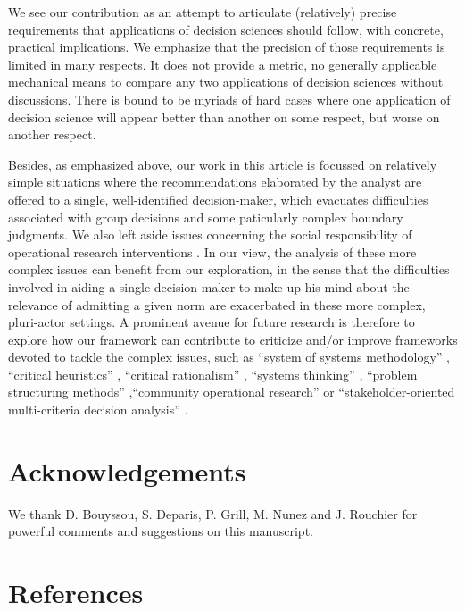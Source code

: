 \documentclass[preprint, french, english, 11pt, authoryear]{elsarticle}%
\begin{document}
We see our contribution as an attempt to articulate (relatively) precise requirements that applications of decision sciences should follow, with concrete, practical implications. We emphasize that the precision of those requirements is limited in many respects.
It does not provide a metric, no generally applicable mechanical means to compare any two applications of decision sciences without discussions. There is bound to be myriads of hard cases where one application of decision science will appear better than another on some respect, but worse on another respect.

Besides, as emphasized above, our work in this article is focussed on relatively simple situations where the recommendations elaborated by the analyst are offered to a single, well-identified decision-maker, which evacuates difficulties associated with group decisions and some paticularly complex boundary judgments. We also left aside issues concerning the social responsibility of operational research interventions \citep{ackoff_social_1974,gallo_operations_2004}.  In our view, the analysis of these more complex issues can benefit from our exploration, in the sense that the difficulties involved in aiding a single decision-maker to make up his mind about the relevance of admitting a given norm are exacerbated in these more complex, pluri-actor settings. A prominent avenue for future research is therefore to explore how our framework can contribute to criticize and/or improve frameworks devoted to tackle the complex issues, such as ``system of systems methodology'' \citep{jackson_towards_1984}, ``critical heuristics'' \citep{ulrich_critical_1987}, ``critical rationalism'' \citep{ormerod_critical_2014}, ``systems thinking'' \citep{mingers_review_2010}, ``problem structuring methods'' \citep{hector_problem-structuring_2009},``community operational research'' \citep{johnson_emerging_2018} or ``stakeholder-oriented multi-criteria decision analysis'' \citep{de_brucker_multi-criteria_2013}.

\setcounter{secnumdepth}{0}
\section{Acknowledgements}
We thank D. Bouyssou, S. Deparis, P. Grill, M. Nunez and J. Rouchier for powerful comments and suggestions on this manuscript.

\section{References}

\end{document}
